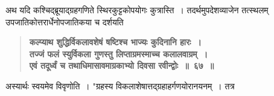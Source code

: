\documentclass[11pt, openany]{book}
\begin{document}
\begin{sloppypar}
{\small अथ यदि कश्चिद्ब्रूयाद्ग्रहगणिते स्थिरकुट्टकोपयोगः कुत्रास्ति~। तदर्थमुपदेशव्याजेन तत्स्थलम् उपजातिकोत्तरार्धेनोपजातिकया च दर्शयति\textendash }

 \label{5.67}
\begin{quote}
{\large \textbf{{\color{purple}कल्प्याथ शुद्धिर्विकलावशेषं षष्टिश्च भाज्यः कुदिनानि हारः~।\\
तज्जं फलं स्युर्विकला गुणस्तु लिप्ताग्रमस्माच्च कलालवाग्रम्~।\\
एवं तदूर्ध्वं च तथाधिमासावमाग्रकाभ्यो दिवसा रवीन्द्वोः~॥~६७~॥}}}
\end{quote}

अस्यार्थः स्वयमेव विवृणोति~। "ग्रहस्य विकलाशेषात्तद्ग्रहाहर्गणयोरानयनम्~। तत्र
\end{sloppypar}

\newpage
\end{document}
